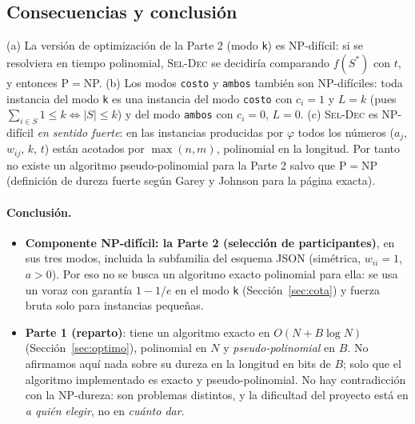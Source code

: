 \subsection{Consecuencias y conclusión}

\begin{corolario}\label{cor:opt}
(a) La versión de optimización de la Parte 2 (modo \texttt{k}) es NP-difícil: si se resolviera en tiempo polinomial, \textsc{Sel-Dec} se decidiría comparando $f(S^\ast)$ con $t$, y entonces P$=$NP.
(b) Los modos \texttt{costo} y \texttt{ambos} también son NP-difíciles: toda instancia del modo \texttt{k} es una instancia del modo \texttt{costo} con $c_i=1$ y $L=k$ (pues $\sum_{i\in S}1\le k\iff|S|\le k$) y del modo \texttt{ambos} con $c_i=0$, $L=0$.
(c) \textsc{Sel-Dec} es NP-difícil \emph{en sentido fuerte}: en las instancias producidas por $\varphi$ todos los números ($a_j$, $w_{ij}$, $k$, $t$) están acotados por $\max(n,m)$, polinomial en la longitud. Por tanto no existe un algoritmo pseudo-polinomial para la Parte 2 salvo que P$=$NP (definición de dureza fuerte según Garey y Johnson \cite{gj1979} \VER{} para la página exacta).
\end{corolario}

\paragraph{Conclusión.}
\begin{itemize}[leftmargin=*]
\item \textbf{Componente NP-difícil: la Parte 2 (selección de participantes)}, en sus tres modos, incluida la subfamilia del esquema JSON (simétrica, $w_{ii}=1$, $a>0$). Por eso no se busca un algoritmo exacto polinomial para ella: se usa un voraz con garantía $1-1/e$ en el modo \texttt{k} (Sección~\ref{sec:cota}) y fuerza bruta solo para instancias pequeñas.
\item \textbf{Parte 1 (reparto)}: tiene un algoritmo exacto en $O(N+B\log N)$ (Sección~\ref{sec:optimo}), polinomial en $N$ y \emph{pseudo-polinomial} en $B$. No afirmamos aquí nada sobre su dureza en la longitud en bits de $B$; solo que el algoritmo implementado es exacto y pseudo-polinomial. No hay contradicción con la NP-dureza: son problemas distintos, y la dificultad del proyecto está en \emph{a quién elegir}, no en \emph{cuánto dar}.
\end{itemize}
